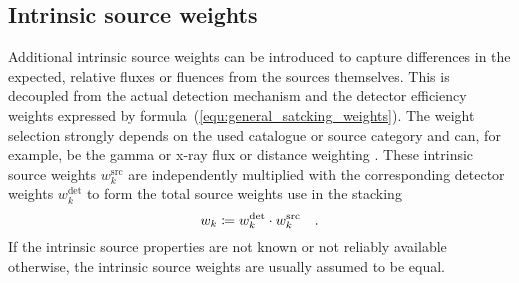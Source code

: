 \subsection{Intrinsic source weights}
Additional intrinsic source weights can be introduced to capture differences in the expected, relative fluxes or fluences from the sources themselves.
This is decoupled from the actual detection mechanism and the detector efficiency weights expressed by formula~(\ref{equ:general_satcking_weights}).
The weight selection strongly depends on the used catalogue or source category and can, for example, be the gamma or x-ray flux or distance weighting .
These intrinsic source weights $w_k^\text{src}$ are independently multiplied with the corresponding detector weights $w_k^\text{det}$ to form the total source weights use in the stacking
\begin{equation}
  w_k \coloneqq w_k^\text{det} \cdot w_k^\text{src}
  \quad\text{.}
\end{equation}
If the intrinsic source properties are not known or not reliably available otherwise, the intrinsic source weights are usually assumed to be equal.

